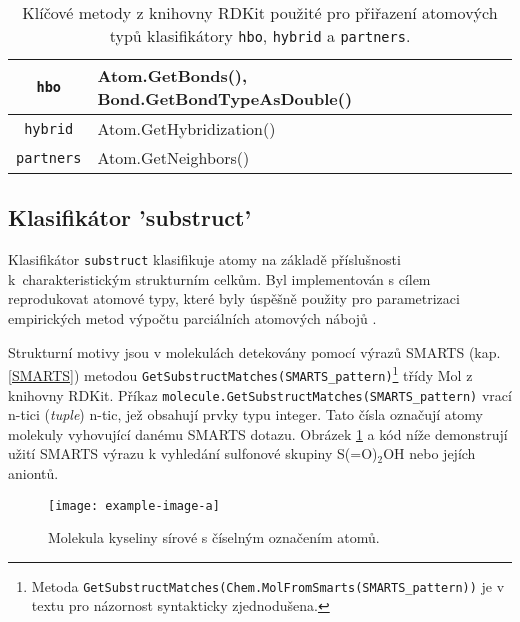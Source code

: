 \begin{table}[h]
\begin{center}
\label{atom_rdkit_methods}
\renewcommand{\arraystretch}{1.3}
    \begin{small}
    \hspace{7mm}\begin{tabular}{c|l}
        \verb|hbo| & Atom.GetBonds(), Bond.GetBondTypeAsDouble() \\
        \hline
        \verb|hybrid| & Atom.GetHybridization() \\
        \hline
        \verb|partners| & Atom.GetNeighbors() \\
    \end{tabular}
    \end{small}
    \caption{Klíčové metody z knihovny RDKit použité pro přiřazení atomových typů klasifikátory \texttt{hbo}, \texttt{hybrid} a \texttt{partners}.}
\end{center}
\end{table}
\subsection{Klasifikátor 'substruct'}
Klasifikátor \verb|substruct| klasifikuje atomy na základě příslušnosti k~charakteristickým strukturním celkům. Byl implementován s cílem reprodukovat atomové typy, které byly úspěšně použity pro parametrizaci empirických metod výpočtu parciálních atomových nábojů \cite{attyp2, attyp1}. 

Strukturní motivy jsou v molekulách detekovány pomocí výrazů SMARTS (kap. \ref{SMARTS}) metodou  \verb|GetSubstructMatches(SMARTS_pattern)|\footnote{Metoda  \texttt{GetSubstructMatches(Chem.MolFromSmarts(SMARTS\_pattern))} je v textu pro názornost syntakticky zjednodušena.} třídy Mol z kni\-hovny RDKit. 
Příkaz \verb|molecule.GetSubstructMatches(SMARTS_pattern)| 
vrací n-tici (\textit{tuple}) n-tic, jež obsahují prvky typu integer. Tato čísla označují atomy molekuly vyhovující danému SMARTS dotazu. Obrázek \ref{h2so5} a kód níže demonstrují užití SMARTS výrazu k vyhledání sulfonové skupiny S(=O)$_2$OH nebo jejích aniontů.

\begin{figure}[h]
    \centering
    \texttt{[image: example-image-a]}
    \caption{Molekula kyseliny sírové s číselným označením atomů.}
    \label{h2so5}
\end{figure}

